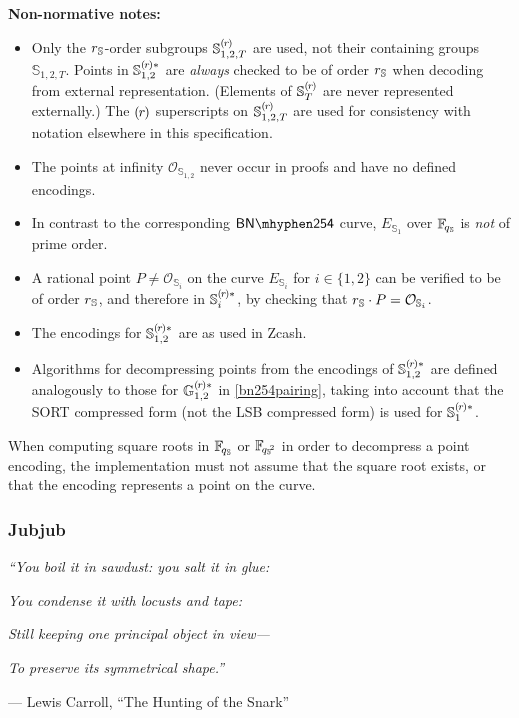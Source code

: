 \documentclass{article}
\newcommand{\crossref}[1]{\autoref{#1}}
\newcommand{\callout}[1]{\vspace{2ex plus 2pt minus 2pt}\noindent\textbf{#1}\hspace{1em}}
\newenvironment{nnotes}{\callout{Non-normative notes:}\begin{itemize}}{\end{itemize}}
\newcommand{\tab}{\hspace{1.5em}}
\newcommand{\Field}[1]{\mathbb{F}_{\!#1}}
\newcommand{\setof}[1]{\{{#1}\}}
\newcommand{\mult}{\cdot}
\newcommand{\Curve}{E}
\newcommand{\Zero}{\mathcal{O}}
\newcommand{\subgroupr}{(\kern-0.075emr\kern-0.075em)}
\newcommand{\GroupG}[1]{\mathbb{G}_{#1}}
\newcommand{\SubgroupGstar}[1]{\GroupG{#1}^{\subgroupr\ast}}
\newcommand{\ParamS}[1]{{{#1}_\mathbb{\hskip 0.03em S}}}
\newcommand{\ParamSexp}[2]{{{#1}_\mathbb{\hskip 0.03em S}\!}^{#2}}
\newcommand{\GroupS}[1]{\mathbb{S}_{#1}}
\newcommand{\SubgroupS}[1]{\GroupS{#1}^{\subgroupr}}
\newcommand{\SubgroupSstar}[1]{\GroupS{#1}^{\subgroupr\ast}}
\newcommand{\CurveS}[1]{\Curve_{\GroupS{#1}}}
\newcommand{\ZeroS}[1]{\Zero_{\GroupS{#1}}}
\newcommand{\BNPairing}{\mathsf{BN\mhyphen254}}
\begin{document}
\begin{nnotes}
  \item Only the $\ParamS{r}$-order subgroups $\SubgroupS{1, 2, T}$ are used,
        not their containing groups $\GroupS{1, 2, T}$. Points in
        $\SubgroupSstar{1, 2}$ are \emph{always} checked to be of order $\ParamS{r}$ when
        decoding from external representation. (Elements of $\SubgroupS{T}$ are
        never represented externally.)
        The $\subgroupr$ superscripts on $\SubgroupS{1, 2, T}$ are used for consistency with
        notation elsewhere in this specification.
  \item The points at infinity $\ZeroS{1, 2}$ never occur in proofs and have no defined encodings.
  \item In contrast to the corresponding $\BNPairing$ curve, $\CurveS{1}$ over $\Field{\ParamS{q}}$
        is \emph{not} of prime order.
  \item A rational point $P \neq \ZeroS{i}$ on the curve $\CurveS{i}$ for $i \in \setof{1, 2}$
        can be verified to be of order $\ParamS{r}$, and therefore in $\SubgroupSstar{i}$,
        by checking that $\ParamS{r} \mult P = \ZeroS{i}$.
  \item The encodings for $\SubgroupSstar{1, 2}$ are as used in Zcash.
  \item Algorithms for decompressing points from the encodings of
        $\SubgroupSstar{1, 2}$ are defined analogously to those for
        $\SubgroupGstar{1, 2}$ in \crossref{bn254pairing}, taking into account that
        the SORT compressed form (not the LSB compressed form) is used
        for $\SubgroupSstar{1}$.
\end{nnotes}

When computing square roots in $\Field{\ParamS{q}}$ or $\Field{\ParamSexp{q}{2}}$
in order to decompress a point encoding, the implementation must not assume
that the square root exists, or that the encoding represents a point on the
curve.


\subsubsection{Jubjub} \label{jubjub}

\hfill\begin{minipage}{0.52\linewidth}
\small
\begin{poetry}
  \item \emph{``You boil it in sawdust: you salt it in glue:}
  \item \tab\emph{You condense it with locusts and tape:}
  \item \emph{\hphantom{``}Still keeping one principal object in view---}
  \item \tab\emph{To preserve its symmetrical shape.''}
        \vspace{0.5ex}
  \item \hfill--- Lewis Carroll, ``The Hunting of the Snark'' \cite{Carroll1876}\!\!
\end{poetry}
\end{minipage}
\vspace{2ex}
\end{document}
